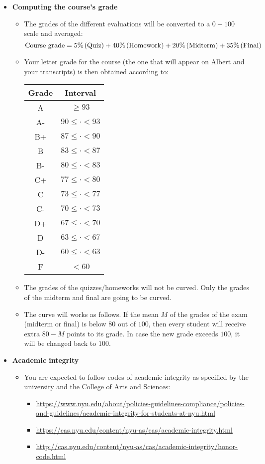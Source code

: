 \documentclass[11pt]{article}
\begin{document}
\begin{itemize}
	
\item \textbf{Computing the course's grade}
	\begin{itemize}
	\item The grades of the different evaluations will be converted to a $0-100$ scale and averaged:
		$$
		{\rm Course \ grade} = 5\%\, ({\rm Quiz}) 
		+ 40\%\, ({\rm Homework})
		+ 20\%\, ({\rm Midterm})
		+ 35\%\, ({\rm Final})
		$$
	\item Your letter grade for the course (the one that will appear on Albert and your transcripts) is then obtained according to:
		\begin{center}
		\begin{tabular}{|c|c|}
			\hline
			Grade & Interval \\
			\hline
			A & $\geq 93$ \\
			A- & $90 \leq \cdot < 93$ \\
			B+ & $87 \leq \cdot < 90$ \\
			B & $83 \leq \cdot < 87$ \\
			B- & $80 \leq \cdot < 83$ \\
			C+ & $77 \leq \cdot < 80$ \\
			C & $73 \leq \cdot < 77$ \\
			C- & $70 \leq \cdot < 73$ \\
			D+ & $67 \leq \cdot < 70$ \\
			D & $63\leq \cdot < 67$ \\
			D- & $60 \leq \cdot < 63$ \\
			F & $< 60$\\
			\hline
		\end{tabular}
		\end{center}
	\item The grades of the quizzes/homeworks will not be curved. Only the grades of the midterm and final are going to be curved.
	\item The curve will works as follows. If the mean $M$ of the grades of the exam (midterm or final) is below $80$ out of $100$, then every student will receive extra $80-M$ points to its grade. In case the new grade exceeds $100$, it will be changed back to $100$.
\end{itemize}

	\item \textbf{Academic integrity}
	\begin{itemize}
		\item You are expected to follow codes of academic integrity as specified by the university and the College of Arts and Sciences:
		\begin{itemize}
			\item \url{https://www.nyu.edu/about/policies-guidelines-compliance/policies-and-guidelines/academic-integrity-for-students-at-nyu.html}
			\item \url{https://cas.nyu.edu/content/nyu-as/cas/academic-integrity.html}
			\item \url{http://cas.nyu.edu/content/nyu-as/cas/academic-integrity/honor-code.html}
		\end{itemize}
	\end{itemize}
\end{itemize}
\end{document}
